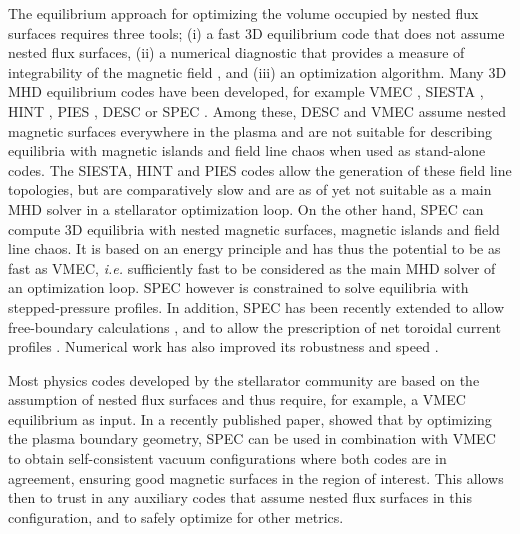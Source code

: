 \documentclass[my_thesis.tex]{subfiles}
\begin{document}
The equilibrium approach for optimizing the volume occupied by nested flux surfaces requires three tools; (i) a fast 3D equilibrium code that does not assume nested flux surfaces, (ii) a numerical diagnostic that provides a measure of integrability of the magnetic field \citep{Meiss1992c,MacKay1985,Greene1978,Loizu2017}, and (iii) an optimization algorithm.
Many \ac{3D} \ac{MHD} equilibrium codes have been developed, for example VMEC \citep{Hirshman1983,Hirshman1986}, SIESTA \citep{Hirshman2008,Peraza-Rodriguez2017}, HINT \citep{Harafuji1989,Suzuki2006}, PIES \citep{Reiman1986,Drevlak2005}, DESC \citep{Dudt2020} or \ac{SPEC} \citep{Hudson2012}. Among these, DESC and VMEC assume nested magnetic surfaces everywhere in the plasma and are not suitable for describing equilibria with magnetic islands and field line chaos when used as stand-alone codes. The SIESTA, HINT and PIES codes allow the generation of these field line topologies, but are comparatively slow and are as of yet not suitable as a main \ac{MHD} solver in a stellarator optimization loop.
On the other hand, \ac{SPEC} can compute 3D equilibria with nested magnetic surfaces, magnetic islands and field line chaos. It is based on an energy principle and has thus the potential to be as fast as VMEC, \textit{i.e.} sufficiently fast to be considered as the main \ac{MHD} solver of an optimization loop. \ac{SPEC} however is constrained to solve equilibria with stepped-pressure profiles. In addition, \ac{SPEC} has been recently extended to allow free-boundary calculations \citep{Hudson2020c}, and to allow the prescription of net toroidal current profiles \citep{Baillod2021}. Numerical work has also improved its robustness and speed \citep{Qu2020}.

Most physics codes developed by the stellarator community are based on the assumption of nested flux surfaces and thus require, for example, a VMEC equilibrium as input. In a recently published paper, \citet{Landreman2021a} showed that by optimizing the plasma boundary geometry, \ac{SPEC} can be used in combination with VMEC to obtain self-consistent vacuum configurations where both codes are in agreement, ensuring good magnetic surfaces in the region of interest. This allows then to trust in any auxiliary codes that assume nested flux surfaces in this configuration, and to safely optimize for other metrics. 
\end{document}
